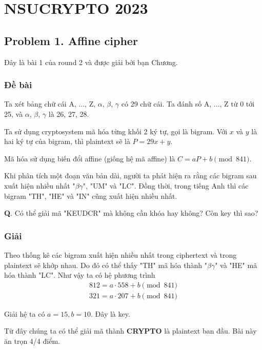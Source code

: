 \chapter*{NSUCRYPTO 2023}

\section*{Problem 1. Affine cipher}

Đây là bài 1 của round 2 và được giải bởi bạn Chương.

\subsection*{Đề bài}

Ta xét bảng chữ cái {A, ..., Z, $\alpha$, $\beta$, $\gamma$} có 29 chữ cái. Ta đánh số A, ..., Z từ 0 tới 25, và $\alpha$, $\beta$, $\gamma$ là 26, 27, 28.

Ta sử dụng cryptosystem mã hóa từng khối 2 ký tự, gọi là bigram. Với $x$ và $y$ là hai ký tự của bigram, thì plaintext sẽ là $P = 29 x + y$.

Mã hóa sử dụng biến đổi affine (giống hệ mã affine) là $C = a P + b \pmod{841}$.

Khi phân tích một đoạn văn bản dài, người ta phát hiện ra rằng các bigram sau xuất hiện nhiều nhất "$\beta\gamma$", "UM" và "LC". Đồng thời, trong tiếng Anh thì các bigram "TH", "HE" và "IN" cũng xuất hiện nhiều nhất.

\textbf{Q}. Có thể giải mã "KEUDCR" mà không cần khóa hay không? Còn key thì sao?

\subsection*{Giải}

Theo thống kê các bigram xuất hiện nhiều nhất trong ciphertext và trong plaintext sẽ khớp nhau. Do đó có thể thấy "TH" mã hóa thành "$\beta\gamma$" và "HE" mã hóa thành "LC". Như vậy ta có hệ phương trình
\begin{align*} 
    812 = a \cdot 558 + b \pmod{841} \\ 
    321 = a \cdot 207 + b \pmod{841}
\end{align*} 

Giải hệ ta có $a = 15, b = 10$. Đây là key.

Từ đây chúng ta có thể giải mã thành \textbf{CRYPTO} là plaintext ban đầu. Bài này ăn trọn 4/4 điểm.

